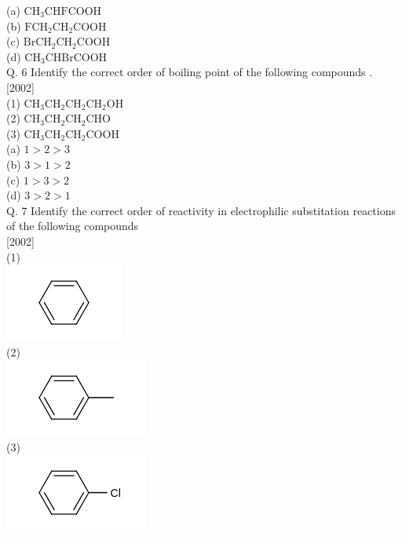 \documentclass[10pt]{article}
\begin{document}
(a) $\mathrm{CH}_{3} \mathrm{CHFCOOH}$\\
(b) $\mathrm{FCH}_{2} \mathrm{CH}_{2} \mathrm{COOH}$\\
(c) $\mathrm{BrCH}_{2} \mathrm{CH}_{2} \mathrm{COOH}$\\
(d) $\mathrm{CH}_{3} \mathrm{CHBrCOOH}$\\
Q. 6 Identify the correct order of boiling point of the following compounds .\\[0pt]
[2002]\\
(1) $\mathrm{CH}_{3} \mathrm{CH}_{2} \mathrm{CH}_{2} \mathrm{CH}_{2} \mathrm{OH}$\\
(2) $\mathrm{CH}_{3} \mathrm{CH}_{2} \mathrm{CH}_{2} \mathrm{CHO}$\\
(3) $\mathrm{CH}_{3} \mathrm{CH}_{2} \mathrm{CH}_{2} \mathrm{COOH}$\\
(a) $1>2>3$\\
(b) $3>1>2$\\
(c) $1>3>2$\\
(d) $3>2>1$\\
Q. 7 Identify the correct order of reactivity in electrophilic substitation reactions of the following compounds\\[0pt]
[2002]\\
(1)\\
\includegraphics{smile-3e54a70783c65235d975eb361ca75744a5d7dcaa}\\
(2)\\
\includegraphics{smile-8371b0b5a2acebe40d930f455eeffb83e69b95bb}\\
(3)\\
\includegraphics{smile-04245f44528ca2c560b940d6971765acbd08ca27}\\
\end{document}
